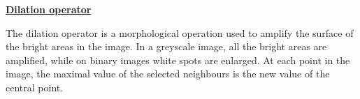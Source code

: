 \documentclass[12pt,a4paper]{article}
\begin{document}
\begin{center}
\textbf{\huge  \underline{Dilation operator}}
\end{center}
\vspace{0.5cm}

The dilation operator is a morphological operation used to amplify the surface of the bright areas in the image. In a greyscale image, all the bright areas are amplified, while on binary images white spots are enlarged.
At each point in the image, the maximal value of the selected neighbours is the new value of the central point.\\


\begin{figure}[h!]
\centering
{}
\end{figure}

\vspace{0.5cm}
\end{document}
